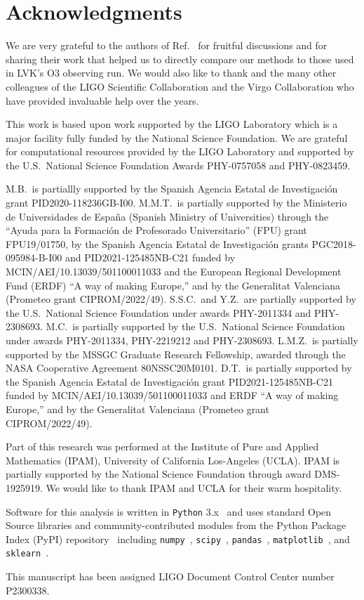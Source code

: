 \section*{Acknowledgments}

We are very grateful to the authors of Ref.~\cite{Chatterjee:2019avs} for fruitful discussions and for sharing their work that helped us to directly compare our methods to those used in
\ac{LVK}'s \ac{O3} observing run. We would also like to thank  and the many other colleagues of the LIGO Scientific Collaboration and the Virgo Collaboration who have provided invaluable help over
the years.

This work is based upon work supported by the LIGO Laboratory which is a major facility fully funded by the National Science Foundation. We are grateful for computational resources provided by
the LIGO Laboratory and supported by the U.S.\ National Science Foundation Awards PHY-0757058 and PHY-0823459. 

M.B.\ is partiallly supported by the Spanish Agencia Estatal de Investigaci\'on grant PID2020-118236GB-I00. M.M.T.\ is partially supported by the Ministerio de Universidades de Espa\~na (Spanish
Ministry of Universities) through the ``Ayuda para la Formaci\'on de Profesorado Universitario'' (FPU) grant FPU19/01750, by the Spanish Agencia Estatal de Investigaci\'on grants
PGC2018-095984-B-I00 and PID2021-125485NB-C21 funded by MCIN/AEI/10.13039/501100011033 and the European Regional Development Fund (ERDF) ``A way of making Europe,'' and by the Generalitat
Valenciana (Prometeo grant CIPROM/2022/49). S.S.C.\ and Y.Z.\ are partially supported by the U.S.\ National Science Foundation under awards PHY-2011334 and PHY-2308693. M.C.\ is partially
supported by the U.S.\ National Science Foundation under awards PHY-2011334, PHY-2219212 and PHY-2308693. L.M.Z.\ is partially supported by the MSSGC Graduate Research Fellowship, awarded
through the NASA Cooperative Agreement 80NSSC20M0101. D.T.~is partially supported by the Spanish Agencia Estatal de Investigaci\'on grant PID2021-125485NB-C21 funded by
MCIN/AEI/10.13039/501100011033 and ERDF ``A way of making Europe,'' and by the Generalitat Valenciana (Prometeo grant CIPROM/2022/49).

Part of this research was performed at the Institute of Pure and Applied Mathematics (IPAM),  University of California Los-Angeles (UCLA). IPAM is partially supported by the National Science
Foundation through award DMS-1925919. We would like to thank IPAM and UCLA for their warm hospitality. 

Software for this analysis is written in \texttt{Python} 3.x~\cite{python3} and uses standard Open Source libraries and community-contributed modules from the Python Package Index (PyPI)
repository~\cite{pypi} including \texttt{numpy}~\cite{harris2020array}, \texttt{scipy}~\cite{2020SciPy-NMeth}, \texttt{pandas}~\cite{reback2020pandas,mckinney-proc-scipy-2010},
\texttt{matplotlib}~\cite{Hunter:2007ouj}, and \texttt{sklearn}~\cite{scikit-learn}.

This manuscript has been assigned LIGO Document Control Center number P2300338.





